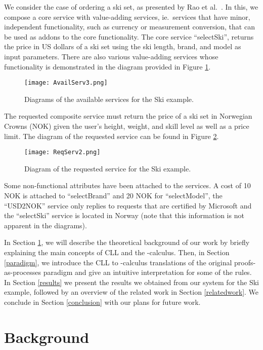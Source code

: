 \documentclass[copyright,creativecommons]{eptcs}
\begin{document}
We consider the case of ordering a ski set, as presented by Rao et al.\ \cite{rao2006composition}. In this, we compose a core service with value-adding services, ie.\ services that have minor, independent functionality, such as currency or measurement conversion, that can be used as addons to the core functionality. The core service ``selectSki'', returns the price in US dollars of a ski set using the ski length, brand, and model as input parameters. There are also various value-adding services whose functionality is demonstrated in the diagram provided in Figure \ref{fig:AvailServ}. 
\begin{figure}[htbp]
	\centering
		\texttt{[image: AvailServ3.png]}
	\caption{Diagrams of the available services for the Ski example.}
	\label{fig:AvailServ}
\end{figure}
The requested composite service must return the price of a ski set in Norwegian Crowns (NOK) given the user's height, weight, and skill level as well as a price limit. The diagram of the requested service can be found in Figure \ref{fig:ReqServ}.
\begin{figure}[htbp]
	\centering
		\texttt{[image: ReqServ2.png]}
	\caption{Diagram of the requested service for the Ski example.}
	\label{fig:ReqServ}
\end{figure}
Some non-functional attributes have been attached to the services. A cost of 10 NOK is attached to ``selectBrand'' and 20 NOK for ``selectModel'', the ``USD2NOK'' service only replies to requests that are certified by Microsoft and the ``selectSki'' service is located in Norway (note that this information is not apparent in the diagrams).

In Section \ref{background}, we will describe the theoretical background of our work by briefly explaining the main concepts of CLL and the -calculus. Then, in Section \ref{paradigm}, we introduce the CLL to -calculus translations of the original proofs-as-processes paradigm and give an intuitive interpretation for some of the rules. In Section \ref{results} we present the results we obtained from our system for the Ski example, followed by an overview of the related work in Section \ref{relatedwork}. We conclude in Section \ref{conclusion} with our plans for future work.

\section{Background}
\label{background}
\end{document}
